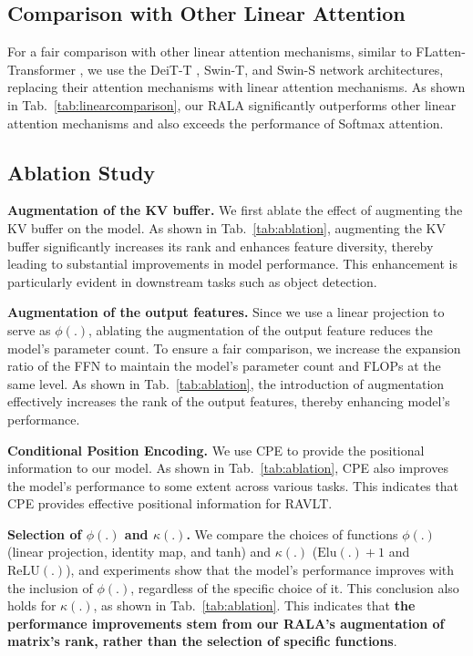 \documentclass[10pt,twocolumn,letterpaper]{article}
\begin{document}
\subsection{Comparison with Other Linear Attention}

For a fair comparison with other linear attention mechanisms, similar to FLatten-Transformer \cite{han2023flatten}, we use the DeiT-T \cite{touvron2021training}, Swin-T, and Swin-S \cite{liu2021swin} network architectures, replacing their attention mechanisms with linear attention mechanisms. As shown in Tab.~\ref{tab:linearcomparison}, our RALA significantly outperforms other linear attention mechanisms and also exceeds the performance of Softmax attention.

\subsection{Ablation Study}

\textbf{Augmentation of the KV buffer.} We first ablate the effect of augmenting the KV buffer on the model. As shown in Tab.~\ref{tab:ablation}, augmenting the KV buffer significantly increases its rank and enhances feature diversity, thereby leading to substantial improvements in model performance. This enhancement is particularly evident in downstream tasks such as object detection.

\textbf{Augmentation of the output features.} Since we use a linear projection to serve as $\phi(.)$, ablating the augmentation of the output feature reduces the model's parameter count. To ensure a fair comparison, we increase the expansion ratio of the FFN to maintain the model's parameter count and FLOPs at the same level. As shown in Tab.~\ref{tab:ablation}, the introduction of augmentation effectively increases the rank of the output features, thereby enhancing model's performance.

\textbf{Conditional Position Encoding.} We use CPE \cite{chu2023conditional} to provide the positional information to our model. As shown in Tab.~\ref{tab:ablation}, CPE also improves the model's performance to some extent across various tasks. This indicates that CPE provides effective positional information for RAVLT.

\textbf{Selection of $\phi(.)$ and $\kappa(.)$.} We compare the choices of functions $\phi(.)$ (linear projection, identity map, and tanh) and $\kappa(.)$ ($\mathrm{Elu}(.) + 1$ and $\mathrm{ReLU}(.)$), and experiments show that the model's performance improves with the inclusion of $\phi(.)$, regardless of the specific choice of it. This conclusion also holds for $\kappa(.)$, as shown in Tab.~\ref{tab:ablation}. This indicates that \textbf{the performance improvements stem from our RALA's augmentation of matrix's rank, rather than the selection of specific functions}.
\end{document}
